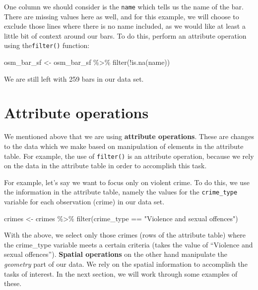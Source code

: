 \documentclass[
]{book}
\makeatletter
\newenvironment{Shaded}{\begin{snugshade}}{\end{snugshade}}
\newcommand{\FunctionTok}[1]{\textcolor[rgb]{0,0,0}{#1}}
\newcommand{\NormalTok}[1]{#1}
\newcommand{\OtherTok}[1]{\textcolor[rgb]{0.37,0.37,0.37}{#1}}
\newcommand{\SpecialCharTok}[1]{\textcolor[rgb]{0,0,0}{#1}}
\newcommand{\StringTok}[1]{\textcolor[rgb]{0.5,0.5,0.5}{#1}}
\newenvironment{kframe}{%
\medskip{}
\setlength{\fboxsep}{.8em}
 \def\at@end@of@kframe{}%
 \ifinner\ifhmode%
  \def\at@end@of@kframe{\end{minipage}}%
  \begin{minipage}{\columnwidth}%
 \fi\fi%
 \def\FrameCommand##1{\hskip\@totalleftmargin \hskip-\fboxsep
 \colorbox{shadecolor}{##1}\hskip-\fboxsep
     \hskip-\linewidth \hskip-\@totalleftmargin \hskip\columnwidth}%
 \MakeFramed {\advance\hsize-\width
   \@totalleftmargin\z@ \linewidth\hsize
   \@setminipage}}%
 {\par\unskip\endMakeFramed%
 \at@end@of@kframe}
\renewenvironment{Shaded}{\begin{kframe}}{\end{kframe}}
\makeatother
\begin{document}
One column we should consider is the \texttt{name} which tells us the name of the bar. There are missing values here as well, and for this example, we will choose to exclude those lines where there is no name included, as we would like at least a little bit of context around our bars. To do this, perform an attribute operation using the\texttt{filter()} function:

\begin{Shaded}
\begin{Highlighting}[]
\NormalTok{osm\_bar\_sf }\OtherTok{\textless{}{-}}\NormalTok{ osm\_bar\_sf }\SpecialCharTok{\%\textgreater{}\%} \FunctionTok{filter}\NormalTok{(}\SpecialCharTok{!}\FunctionTok{is.na}\NormalTok{(name))}
\end{Highlighting}
\end{Shaded}

We are still left with 259 bars in our data set.

\hypertarget{attribute-operations}{%
\section{Attribute operations}\label{attribute-operations}}

We mentioned above that we are using \textbf{attribute operations}. These are changes to the data which we make based on manipulation of elements in the attribute table. For example, the use of \texttt{filter()} is an attribute operation, because we rely on the data in the attribute table in order to accomplish this task.

For example, let's say we want to focus only on violent crime. To do this, we use the information in the attribute table, namely the values for the \texttt{crime\_type} variable for each observation (crime) in our data set.

\begin{Shaded}
\begin{Highlighting}[]
\NormalTok{crimes }\OtherTok{\textless{}{-}}\NormalTok{ crimes }\SpecialCharTok{\%\textgreater{}\%} 
  \FunctionTok{filter}\NormalTok{(crime\_type }\SpecialCharTok{==} \StringTok{"Violence and sexual offences"}\NormalTok{)}
\end{Highlighting}
\end{Shaded}

With the above, we select only those crimes (rows of the attribute table) where the crime\_type variable meets a certain criteria (takes the value of ``Violence and sexual offences''). \textbf{Spatial operations} on the other hand manipulate the \emph{geometry} part of our data. We rely on the spatial information to accomplish the tasks of interest. In the next section, we will work through some examples of these.
\end{document}
